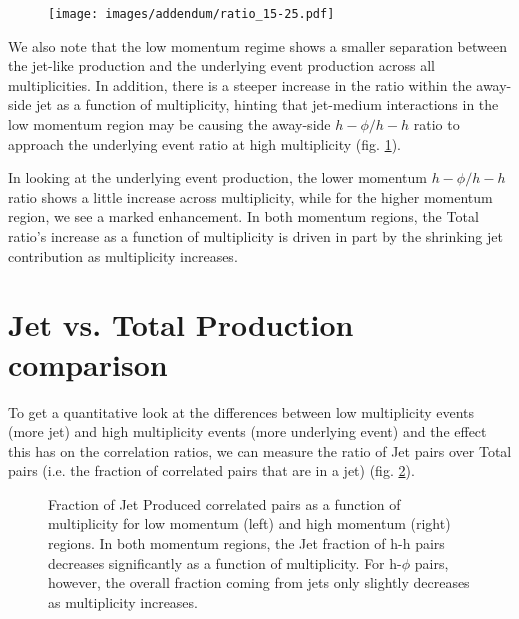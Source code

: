 \documentclass[ALICE,manyauthors]{ALICE_analysis_notes}
\begin{document}
\begin{figure}[ht]
\centering
\texttt{[image: images/addendum/ratio\_15-25.pdf]}
\caption{}
\label{low_momentum_ratio}
\end{figure}

We also note that the low momentum regime shows a smaller separation between the jet-like production and the underlying event production across all multiplicities. In addition, there is a steeper increase in the ratio within the away-side jet as a function of multiplicity, hinting that jet-medium interactions in the low momentum region may be causing the away-side $h-\phi/h-h$ ratio to approach the underlying event ratio at high multiplicity (fig. \ref{low_momentum_ratio}).

In looking at the underlying event production, the lower momentum $h-\phi/h-h$ ratio shows a little increase across multiplicity, while for the higher momentum region, we see a marked enhancement.  In both momentum regions, the Total ratio's increase as a function of multiplicity is driven in part by the shrinking jet contribution as multiplicity increases.

\section{Jet vs. Total Production comparison}

To get a quantitative look at the differences between low multiplicity events (more jet) and high multiplicity events (more underlying event) and the effect this has on the correlation ratios, we can measure the ratio of Jet pairs over Total pairs (i.e. the fraction of correlated pairs that are in a jet) (fig. \ref{jetvstot}).

\begin{figure}[ht]
\centering
\begin{subfigure}{
\texttt{[image: images/addendum/jet2totratio\_lowpt.pdf]}}
\end{subfigure}
\begin{subfigure}{
\texttt{[image: images/addendum/jet2totratio\_highpt.pdf]}}
\end{subfigure}
\caption{Fraction of Jet Produced correlated pairs as a function of multiplicity for low momentum (left) and high momentum (right) regions.  In both momentum regions, the Jet fraction of h-h pairs decreases significantly as a function of multiplicity.  For h-$\phi$ pairs, however, the overall fraction coming from jets only slightly decreases as multiplicity increases.}
\label{jetvstot}
\end{figure}
\end{document}

